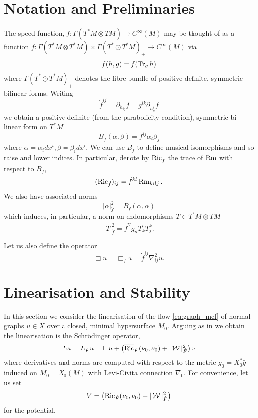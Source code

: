 \documentclass{amsart}
\begin{document}
\section{Notation and Preliminaries}
\label{sec:notation}

The speed function, \(f: \Gamma(T^{\ast}M \otimes TM) \to C^{\infty}(M)\) may be thought of as a function \(f : \Gamma(T^{\ast} M \otimes T^{\ast}M) \times \Gamma(T^{\ast} \odot T^{\ast}M)_+ \to C^{\infty}(M)\) via
\[
f(h, g) = f(\operatorname{Tr}_g h)
\]
where \(\Gamma(T^{\ast} \odot T^{\ast}M)_+\) denotes the fibre bundle of positive-definite, symmetric bilinear forms. Writing
\[
\dot{f}^{ij} = \partial_{h_{ij}} f = g^{ik} \partial_{h^j_k} f
\]
we obtain a positive definite (from the parabolicity condition), symmetric bi-linear form on \(T^{\ast}M\),
\[
B_{\dot{f}} (\alpha, \beta) = f^{ij} \alpha_i \beta_j
\]
where \(\alpha = \alpha_i dx^i, \beta = \beta_i dx^i\). We can use \(B_{\dot{f}}\) to define musical isomorphisms and so raise and lower indices. In particular, denote by \(\operatorname{Ric}_{\dot{f}}\) the trace of \(\operatorname{Rm}\) with respect to \(B_{\dot{f}}\),
\[
(\operatorname{Ric}_{\dot{f}})_{ij} = \dot{f}^{kl} \operatorname{Rm}_{kilj}.
\]
We also have associated norms
\[
|\alpha|_{\dot{f}}^2 = B_{\dot{f}}(\alpha, \alpha)
\]
which induces, in particular, a norm on endomorphisms \(T \in T^{\ast}M \otimes TM\)
\[
|T|_{\dot{f}}^2 = \dot{f}^{ij} g_{il} T^l_k T^k_j.
\]

Let us also define the operator
\[
\Box u = \Box_{\dot{f}} u = \dot{f}^{ij} \nabla^2_{ij} u.
\]

\section{Linearisation and Stability}
\label{sec:linearising_linearisation}

In this section we consider the linearisation of the flow \eqref{eq:graph_mcf} of normal graphs \(u \in X\) over a closed, minimal hypersurface \(M_0\). Arguing as in \cite[Lemmas 3.1, 3,2, 3.5]{Harltey:/2016} we obtain the linearisation is the Schr\"odinger operator,
\begin{equation}
\label{eq:linearisation}
L u = L_{\dot{F}} u = \Box u + \left(\overline{\operatorname{Ric}}_{\dot{F}}(\nu_0, \nu_0) + |\operatorname{\mathcal{W}}|_{\dot{F}}^2\right) u
\end{equation}
where derivatives and norms are computed with respect to the metric \(g_0 = X_0^{\ast} \bar{g}\) induced on \(M_0 = X_0(M)\) with Levi-Civita connection \(\nabla_0\). For convenience, let us set
\[
V = \left(\overline{\operatorname{Ric}}_{\dot{F}}(\nu_0, \nu_0) + |\operatorname{\mathcal{W}}|_{\dot{F}}^2\right)
\]
for the potential.
\end{document}
